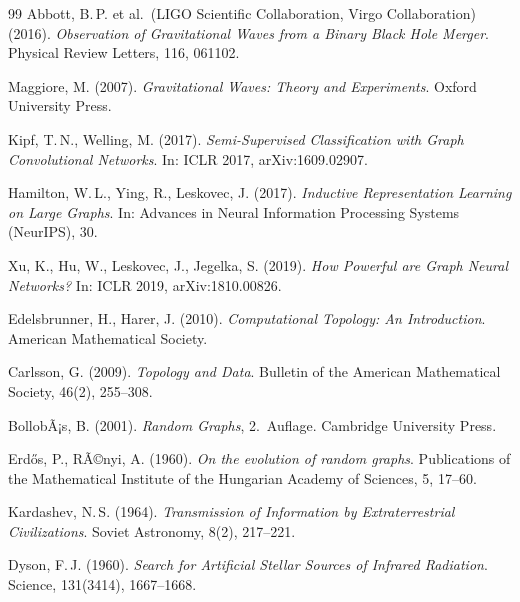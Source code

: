 ﻿\documentclass[a4paper,12pt]{report}
\theoremstyle{definition}
\begin{document}
\begin{thebibliography}{99}
Abbott, B.\,P. et al.\ (LIGO Scientific Collaboration, Virgo Collaboration) (2016). \textit{Observation of Gravitational Waves from a Binary Black Hole Merger}. Physical Review Letters, 116, 061102.

Maggiore, M. (2007). \textit{Gravitational Waves: Theory and Experiments}. Oxford University Press.


Kipf, T.\,N., Welling, M. (2017). \textit{Semi-Supervised Classification with Graph Convolutional Networks}. In: ICLR 2017, arXiv:1609.02907.

Hamilton, W.\,L., Ying, R., Leskovec, J. (2017). \textit{Inductive Representation Learning on Large Graphs}. In: Advances in Neural Information Processing Systems (NeurIPS), 30.

Xu, K., Hu, W., Leskovec, J., Jegelka, S. (2019). \textit{How Powerful are Graph Neural Networks?} In: ICLR 2019, arXiv:1810.00826.


Edelsbrunner, H., Harer, J. (2010). \textit{Computational Topology: An Introduction}. American Mathematical Society.

Carlsson, G. (2009). \textit{Topology and Data}. Bulletin of the American Mathematical Society, 46(2), 255--308.


BollobÃ¡s, B. (2001). \textit{Random Graphs}, 2.\ Auflage. Cambridge University Press.

Erd\H{o}s, P., RÃ©nyi, A. (1960). \textit{On the evolution of random graphs}. Publications of the Mathematical Institute of the Hungarian Academy of Sciences, 5, 17--60.


Kardashev, N.\,S. (1964). \textit{Transmission of Information by Extraterrestrial Civilizations}. Soviet Astronomy, 8(2), 217--221.

Dyson, F.\,J. (1960). \textit{Search for Artificial Stellar Sources of Infrared Radiation}. Science, 131(3414), 1667--1668.



\end{thebibliography}
\end{document}
